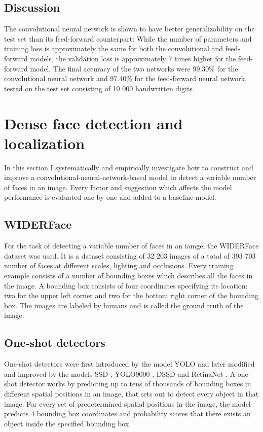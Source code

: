 \documentclass[a4paper, twoside]{article}
\begin{document}
\subsection{Discussion}

The convolutional neural network is shown to have better generalizability on the test set than its feed-forward counterpart: While the number of parameters and training loss is approximately the same for both the convolutional and feed-forward models, the validation loss is approximately 7 times higher for the feed-forward model. The final accuracy of the two networks were 99.30\% for the convolutional neural network and 97.40\% for the feed-forward neural network, tested on the test set consisting of 10 000 handwritten digits. 


\section{Dense face detection and localization}
In this section I systematically and empirically investigate how to construct and improve a convolutional-neural-network-based model to detect a variable number of faces in an image. Every factor and suggestion which affects the model performance is evaluated one by one and added to a baseline model.

\subsection{WIDERFace}
For the task of detecting a variable number of faces in an iamge, the WIDERFace dataset \cite{WIDERFace} was used. It is a dataset consisting of 32 203 images of a total of 393 703 number of faces at different scales, lighting and occlusions. Every training example consists of a number of bounding boxes which describes all the faces in the image. A bounding box consists of four coordinates specifying its location: two for the upper left corner and two for the bottom right corner of the bounding box. The images are labeled by humans and is called the ground truth of the image.

\subsection{One-shot detectors}
One-shot detectors were first introduced by the model YOLO \cite{yolo} and later modified and improved by the models SSD \cite{ssd}, YOLO9000 \cite{yolo9000}, DSSD \cite{dssd} and RetinaNet \cite{retinanet}. A one-shot detector works by predicting up to tens of thousands of bounding boxes in different spatial positions in an image, that sets out to detect every object in that image. For every set of predetermined spatial positions in the image, the model predicts 4 bounding box coordinates and probability scores that there exists an object inside the specified bounding box.
\end{document}
